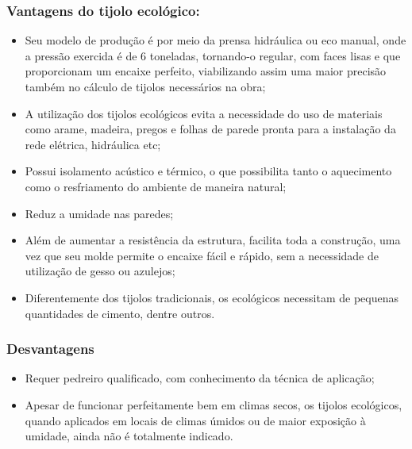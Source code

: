 \subsubsection*{\textbf{Vantagens do tijolo ecológico:}}
	
	\begin{itemize}
		\item Seu modelo de produção é por meio da prensa hidráulica ou eco manual, onde a pressão exercida é de 6 toneladas, tornando-o regular, com faces lisas e que proporcionam um encaixe perfeito, viabilizando assim uma maior precisão também no cálculo de tijolos necessários na obra;

		\item A utilização dos tijolos ecológicos evita a necessidade do uso de materiais como arame, madeira, pregos e folhas de parede pronta para a instalação da rede elétrica, hidráulica etc;

		\item Possui isolamento acústico e térmico, o que possibilita tanto o aquecimento como o resfriamento do ambiente de maneira natural;

		\item Reduz a umidade nas paredes;

		\item Além de aumentar a resistência da estrutura, facilita toda a construção, uma vez que seu molde permite o encaixe fácil e rápido, sem a necessidade de utilização de gesso ou azulejos;

		\item Diferentemente dos tijolos tradicionais, os ecológicos necessitam de pequenas quantidades de cimento, dentre outros.

	\end{itemize}

\subsubsection*{\textbf{Desvantagens}}

	\begin{itemize}

		\item Requer pedreiro qualificado, com conhecimento da técnica de aplicação;

		\item Apesar de funcionar perfeitamente bem em climas secos, os tijolos ecológicos, quando aplicados em locais de climas úmidos ou de maior exposição à umidade, ainda não é totalmente indicado.

	\end{itemize}

